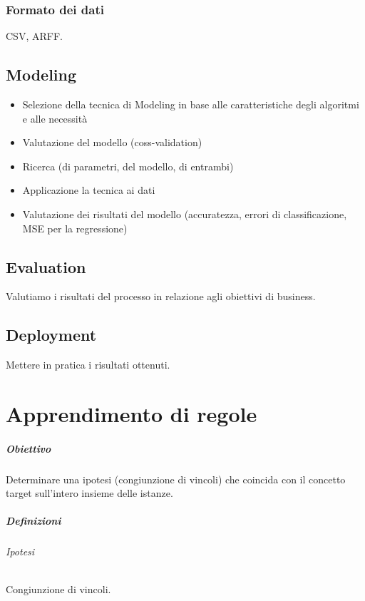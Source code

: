 \documentclass[11pt,onecolumn,a4paper,oneside]{book}
\begin{document}
\subsection{Formato dei dati}
CSV, ARFF.

	\section{Modeling}
		\begin{itemize}
	\item Selezione della tecnica di Modeling in base alle caratteristiche degli algoritmi e alle necessità
	\item Valutazione del modello (coss-validation)
	\item Ricerca (di parametri, del modello, di entrambi)
	\item Applicazione la tecnica ai dati
	\item Valutazione dei risultati del modello (accuratezza, errori di classificazione, MSE per la regressione)
		\end{itemize}			
		
	\section{Evaluation}			
Valutiamo i risultati del processo in relazione agli obiettivi di business.

	\section{Deployment}	
		Mettere in pratica i risultati ottenuti.
		
		
		
		
		
		
\chapter{Apprendimento di regole}

	\paragraph{Obiettivo}
	Determinare una ipotesi (congiunzione di vincoli) che coincida con il concetto target sull'intero insieme delle istanze.
	
	\paragraph{Definizioni}
		\subparagraph{Ipotesi} Congiunzione di vincoli.
		
\end{document}
